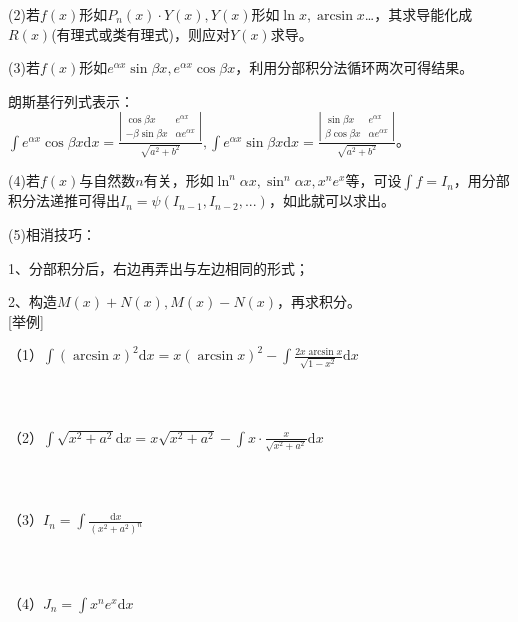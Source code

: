 \documentclass{SCIS2020cn}
\begin{document}
(2)若$f(x)$形如$P_n(x)·Y(x),Y(x)$形如$\ln{x},\arcsin{x}$…，其求导能化成$R(x)$(有理式或类有理式)，则应对$Y(x)$求导。

(3)若$f(x)$形如$e^{\alpha{}x}\sin{\beta{x}},e^{\alpha{}x}\cos{\beta{x}}$，利用分部积分法循环两次可得结果。

朗斯基行列式表示：$\displaystyle\int{e^{\alpha{}x}\cos{\beta{x}}\text{d}x}=\frac{\left| \begin{array}{ccc} \cos{\beta{x}} & e^{\alpha{x}}\\ -\beta\sin{\beta{x}} & \alpha{}e^{\alpha{x}}\end{array} \right|}{\sqrt{a^2+b^2}},\int{e^{\alpha{}x}\sin{\beta{x}}\text{d}x}=\frac{\left| \begin{array}{ccc} \sin{\beta{x}} & e^{\alpha{x}}\\ \beta\cos{\beta{x}} & \alpha{}e^{\alpha{x}}\end{array} \right|}{\sqrt{a^2+b^2}}$。

(4)若$f(x)$与自然数$n$有关，形如$\ln^n\alpha{x},\sin^n{\alpha{x}},x^ne^x$等，可设$\displaystyle\int{f}=I_n$，用分部积分法递推可得出$I_n=\psi{(I_{n-1},I_{n-2},...)}$，如此就可以求出。

(5)相消技巧：

1、分部积分后，右边再弄出与左边相同的形式；

2、构造$M(x)+N(x),M(x)-N(x)$，再求积分。\\


[举例]

（1）$\displaystyle\int{(\arcsin{x})^2}\text{d}x=x(\arcsin{x})^2-\int{\frac{2x\arcsin{x}}{\sqrt{1-x^2}}\text{d}x}$\\\\\\\\

（2）$\displaystyle\int{\sqrt{x^2+a^2}\text{d}x}=x\sqrt{x^2+a^2}-\int{x·\frac{x}{\sqrt{x^2+a^2}}\text{d}x}$\\\\\\\\

（3）$\displaystyle{}I_n=\int{\frac{\text{d}x}{(x^2+a^2)^n}}$\\\\\\\\

（4）$\displaystyle{}J_n=\int{x^ne^x\text{d}x}$\\\\\\\\
\end{document}
